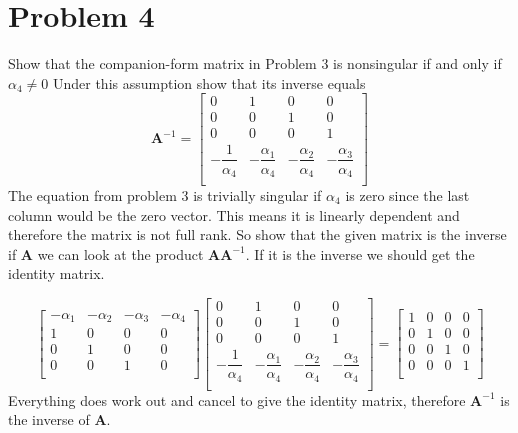 \documentclass{article}
\begin{document}
\section*{Problem 4}
Show that the companion-form matrix in Problem 3 is nonsingular if and only if $\alpha_4 \neq 0$
Under this assumption show that its inverse equals
$$
\mathbf{A}^{-1}
=
\begin{bmatrix}
0 & 1 & 0 & 0 \\
0 & 0 & 1 & 0 \\
0 & 0 & 0 & 1 \\
-\dfrac{1}{\alpha_4} & -\dfrac{\alpha_1}{\alpha_4} & -\dfrac{\alpha_2}{\alpha_4} & -\dfrac{\alpha_3}{\alpha_4} \\
\end{bmatrix}
$$
\newline
\newline
The equation from problem 3 is trivially singular if $\alpha_4$ is zero since the last column would be the zero vector.
This means it is linearly dependent and therefore the matrix is not full rank.
\newline
So show that the given matrix is the inverse if $\mathbf{A}$ we can look at the product $\mathbf{A} \mathbf{A}^{-1}$.
If it is the inverse we should get the identity matrix.

$$
\begin{bmatrix}
-\alpha_1 & -\alpha_2 & -\alpha_3 & -\alpha_4 \\
1 & 0 & 0 & 0 \\
0 & 1 & 0 & 0 \\
0 & 0 & 1 & 0 \\
\end{bmatrix}
\begin{bmatrix}
0 & 1 & 0 & 0 \\
0 & 0 & 1 & 0 \\
0 & 0 & 0 & 1 \\
-\dfrac{1}{\alpha_4} & -\dfrac{\alpha_1}{\alpha_4} & -\dfrac{\alpha_2}{\alpha_4} & -\dfrac{\alpha_3}{\alpha_4} \\
\end{bmatrix}
=
\begin{bmatrix}
1 & 0 & 0 & 0 \\
0 & 1 & 0 & 0 \\
0 & 0 & 1 & 0 \\
0 & 0 & 0 & 1 \\
\end{bmatrix}
$$
Everything does work out and cancel to give the identity matrix, therefore $\mathbf{A}^{-1}$ is the inverse of $\mathbf{A}$.
\end{document}

